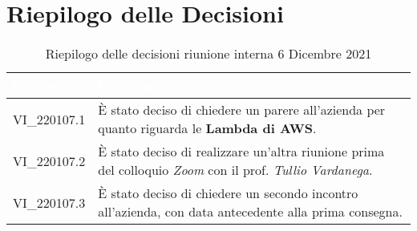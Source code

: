 \section{Riepilogo delle Decisioni}


\begin{table}[!htbp]
\renewcommand{\arraystretch}{1.5}
\begin{tabular}{m{}<{\centering}  m{}<{\centering}}
\rowcolor{darkblue} \textcolor{white}{\textbf{Codice}} & \textcolor{white}{\textbf{Decisione}} \\
\hline
VI\_220107.1 & È stato deciso di chiedere un parere all'azienda per quanto riguarda le \textbf{Lambda di AWS}.\\
\rowcolor{gray!10} VI\_220107.2 &  È stato deciso di realizzare un'altra riunione prima del colloquio \textit{Zoom} con il prof. \textit{Tullio Vardanega}.\\
VI\_220107.3 & È stato deciso di chiedere un secondo incontro all'azienda, con data antecedente alla prima consegna.\\
\end{tabular}
\caption{Riepilogo delle decisioni riunione interna 6 Dicembre 2021}
\end{table}